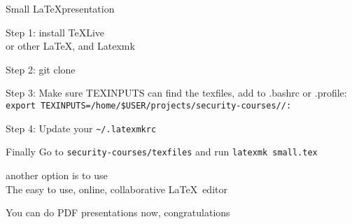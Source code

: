 \documentclass[Screen16to9,17pt]{foils}
\begin{document}
{}

\mytitlepage
{Small \LaTeX presentation}

\LogoOn


\begin{list1}
\item Step 1: install \TeX Live \\
 or other \LaTeX, and Latexmk 
\item Step 2: git clone 
\item Step 3: Make sure TEXINPUTS can find the texfiles, add to .bashrc or .profile:\\
\verb+export TEXINPUTS=/home/$USER/projects/security-courses//:+
\item Step 4: Update your \verb+~/.latexmkrc+
\vskip 5mm
\item Finally Go to \verb+security-courses/texfiles+ and run \verb+latexmk small.tex+
\item another option is to use \\ The easy to use, online, collaborative \LaTeX\ editor
\end{list1}

\vskip 5mm
\centerline{\LARGE You can do PDF presentations now, congratulations}
\end{document}
